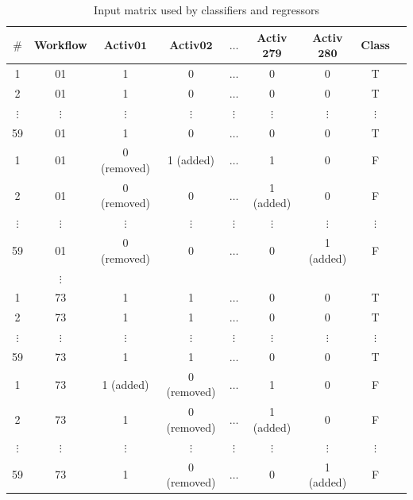 \documentclass[10pt,letterpaper]{article}
\begin{document}
\begin{table}[!htb]
	\tiny
	\centering
	\caption{Input matrix used by classifiers and regressors}
	\begin{tabular}{|c|c|c|c|c|c|c|c|c|}  \hline
		\textbf{\(\#\)} & \textbf{Workflow} & \textbf{Activ\(\mathbf{01}\)} & \textbf{Activ\(\mathbf{02}\)} & \textbf{\(\mathbf{\ldots}\)}  & \textbf{Activ\(\mathbf{279}\)} & \textbf{Activ\(\mathbf{280}\)} & \textbf{Class} \\ \hline
		
		1	&		01		 			   & 1 			  & 0 			  & \(\ldots\) 	  & 0 & 0  			& T	\\ \hline
		2	&		01 					   & 1 			  & 0 			  & \(\ldots\) 	  & 0 & 0  			& T	\\ \hline
		\(\vdots\)  &  \(\vdots\) 	   	   & \(\vdots\)   & \(\vdots\) 	  & \(\vdots\) 	  & \(\vdots\) & \(\vdots\) & \(\vdots\)\\ \hline
		59	&		01 					   & 1 			  & 0 			  & \(\ldots\) 	  & 0 & 0   		& T	\\ \hline
		1	&		01		 			   & 0 (removed) 		  & 1 (added) &\(\ldots\)& 1 & 0	& F	\\ \hline
		2	&		01 					   & 0 (removed)& 0 		  & \(\ldots\) 	  & 1 (added) & 0& F	\\ \hline
		\(\vdots\)  &		\(\vdots\) 	   & \(\vdots\) & \(\vdots\) 	  & \(\vdots\) 	  & \(\vdots\) & \(\vdots\) & \(\vdots\) \\ \hline
		59	&		01 					   & 0 (removed)			  & 0 			  & \(\ldots\) & 0 & 1 (added)& F \\ \hline
		&\(\vdots\) & & & & & & 																		\\ \hline
		1	&		73		 			   & 1 			  & 1  & \(\ldots\) 	  & 0 & 0  			& T	\\ \hline
		2	&		73 					   & 1 			  & 1  & \(\ldots\) 	  & 0 & 0  			& T	\\ \hline
		\(\vdots\)  &		\(\vdots\) 	   & \(\vdots\)   & \(\vdots\) 	  & \(\vdots\) 	  & \(\vdots\) & \(\vdots\) & \(\vdots\) \\ \hline
		59	&		73 					   & 1 			  & 1  & \(\ldots\) 	  & 0 & 0   		& T	\\ \hline
		1	&		73		 			   & 1 (added) & 0 (removed)  & \(\ldots\) 	  & 1 & 0   		& F	\\ \hline
		2	&		73 					   & 1 			  & 0 (removed)  & \(\ldots\)& 1 (added) & 0  & F	\\ \hline
		\(\vdots\)  &		\(\vdots\) 	   & \(\vdots\)   & \(\vdots\) 	  & \(\vdots\) 	  & \(\vdots\) & \(\vdots\) & \(\vdots\)	\\ \hline
		59	&		73 					   & 1 			  & 0 (removed)  & \(\ldots\) 	  & 0 & 1 (added) & F	\\ \hline
	\end{tabular}
	\label{tabela_matriz_de_dados_adapatada_classificacao_regressao}
	\vspace{0.1cm}
\end{table}
\end{document}

